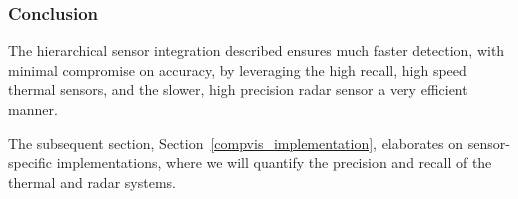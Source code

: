     
    
    
    
    
    
    
    \subsubsection{Conclusion} 
    
        The hierarchical sensor integration described ensures much faster detection, with minimal compromise on accuracy, by leveraging the high recall, high speed thermal sensors, and the slower, high precision radar sensor a very efficient manner.
        
        The subsequent section, Section~\ref{compvis_implementation}, elaborates on sensor-specific implementations, where we will quantify the precision and recall of the thermal and radar systems.